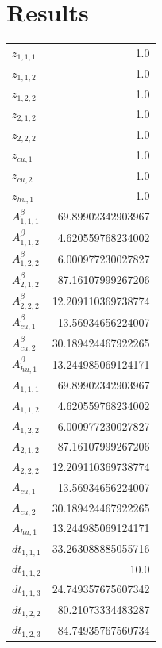 \documentclass{article}%
\makeatletter
\let\mcnewpage=\newpage%
\newcommand{\TrickSupertabularIntoMulticols}{%
\renewcommand\newpage{%
\if@firstcolumn%
\hrule width\linewidth height0pt%
\columnbreak%
\else%
\mcnewpage%
\fi%
}%
}%
\makeatother
\begin{document}
\section{Results}%
\thispagestyle{plain}%
\begin{multicols*}{3}%
\TrickSupertabularIntoMulticols%
%
\begin{supertabular}{lr}%
	$z_{1,1,1}$ & 1.0 \\%
	$z_{1,1,2}$ & 1.0 \\%
	$z_{1,2,2}$ & 1.0 \\%
	$z_{2,1,2}$ & 1.0 \\%
	$z_{2,2,2}$ & 1.0 \\%
	$z_{cu,1}$ & 1.0 \\%
	$z_{cu,2}$ & 1.0 \\%
	$z_{hu,1}$ & 1.0 \\%
	$A_{1,1,1}^{\beta}$ & 69.89902342903967 \\%
	$A_{1,1,2}^{\beta}$ & 4.620559768234002 \\%
	$A_{1,2,2}^{\beta}$ & 6.000977230027827 \\%
	$A_{2,1,2}^{\beta}$ & 87.16107999267206 \\%
	$A_{2,2,2}^{\beta}$ & 12.209110369738774 \\%
	$A_{cu,1}^{\beta}$ & 13.56934656224007 \\%
	$A_{cu,2}^{\beta}$ & 30.189424467922265 \\%
	$A_{hu,1}^{\beta}$ & 13.244985069124171 \\%
	$A_{1,1,1}$ & 69.89902342903967 \\%
	$A_{1,1,2}$ & 4.620559768234002 \\%
	$A_{1,2,2}$ & 6.000977230027827 \\%
	$A_{2,1,2}$ & 87.16107999267206 \\%
	$A_{2,2,2}$ & 12.209110369738774 \\%
	$A_{cu,1}$ & 13.56934656224007 \\%
	$A_{cu,2}$ & 30.189424467922265 \\%
	$A_{hu,1}$ & 13.244985069124171 \\%
	$dt_{1,1,1}$ & 33.263088885055716 \\%
	$dt_{1,1,2}$ & 10.0 \\%
	$dt_{1,1,3}$ & 24.749357675607342 \\%
	$dt_{1,2,2}$ & 80.21073334483287 \\%
	$dt_{1,2,3}$ & 84.74935767560734 \\%

\end{supertabular}
\end{multicols*}
\end{document}
